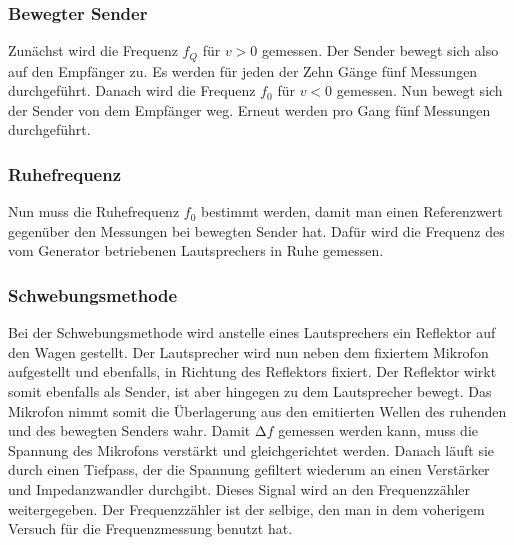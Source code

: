 \subsubsection{Bewegter Sender}
Zunächst wird die Frequenz $f_Q$ für $v >0 $ gemessen. Der Sender bewegt sich also auf den Empfänger zu. Es werden für jeden der Zehn Gänge fünf Messungen durchgeführt.
Danach wird die Frequenz $f_0$ für $v < 0$ gemessen. Nun bewegt sich der Sender von dem Empfänger weg. Erneut werden pro Gang fünf Messungen durchgeführt.
\subsubsection{Ruhefrequenz}
Nun muss die Ruhefrequenz $f_0$ bestimmt werden, damit man einen Referenzwert gegenüber den Messungen bei bewegten Sender hat. Dafür wird die Frequenz des vom Generator betriebenen Lautsprechers in Ruhe gemessen.
\subsubsection{Schwebungsmethode}
Bei der Schwebungsmethode wird anstelle eines Lautsprechers ein Reflektor auf den Wagen gestellt. Der Lautsprecher wird nun neben dem fixiertem Mikrofon aufgestellt und ebenfalls, in Richtung des Reflektors fixiert. Der Reflektor wirkt somit ebenfalls als Sender, ist aber hingegen zu dem Lautsprecher bewegt. Das Mikrofon nimmt somit die Überlagerung aus den emitierten Wellen des ruhenden und des bewegten Senders wahr.
Damit $\increment f$ gemessen werden kann, muss die Spannung des Mikrofons verstärkt und gleichgerichtet werden. Danach läuft sie durch einen Tiefpass, der die Spannung gefiltert wiederum an einen Verstärker und Impedanzwandler durchgibt. Dieses Signal wird an den Frequenzzähler weitergegeben. Der Frequenzzähler ist der selbige, den man in dem voherigem Versuch für die Frequenzmessung benutzt hat.
